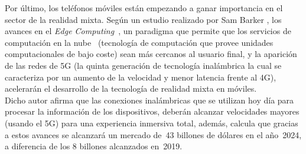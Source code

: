 

Por último, los teléfonos móviles están empezando a ganar importancia en el sector de la realidad mixta. Según un estudio realizado por Sam Barker \cite{juniperArMrmoney}, los avances en el \textit{Edge Computing}~\cite{edgeComputing}, un paradigma que permite que los servicios de computación en la nube~\cite{cloudComputing} (tecnología de computación que provee unidades computacionales de bajo coste) sean más cercanos al usuario final, y la aparición de las redes de 5G (la quinta generación de tecnología inalámbrica la cual se caracteriza por un aumento de la velocidad y menor latencia frente al 4G), acelerarán el desarrollo de la tecnología de realidad mixta en móviles.\\

Dicho autor afirma que las conexiones inalámbricas que se utilizan hoy día para procesar la información de los dispositivos, deberán alcanzar velocidades mayores (usando el 5G) para una experiencia inmersiva total, además, calcula que gracias a estos avances se alcanzará un mercado de~43 billones de dólares en el año~2024, a diferencia de los 8 billones alcanzados en~2019.














